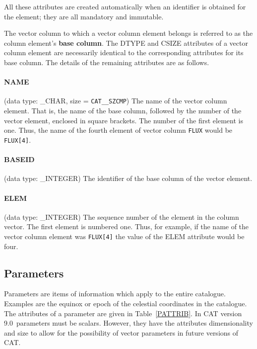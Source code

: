 \documentclass[11pt,twoside]{starlink}
\providecommand{\CATversion}{9.0~}
\begin{document}
All these attributes are created automatically when an identifier is
obtained for the element; they are all mandatory and immutable.

The vector column to which a vector column element belongs is
referred to as the column element's \textbf{base column}. The DTYPE and
CSIZE attributes of a vector column element are necessarily identical
to the corresponding attributes for its base column. The details of the
remaining attributes are as follows.

\paragraph{NAME}
(data type: \_CHAR, size = \texttt{CAT\_\_SZCMP})
The name of the vector column element. That is, the name of the base
column, followed by the number of the vector element, enclosed in
square brackets. The number of the first element is one. Thus, the name
of the fourth element of vector column \texttt{FLUX} would be \texttt{FLUX[4]}.

\paragraph{BASEID}
(data type: \_INTEGER)
The identifier of the base column of the vector element.

\paragraph{ELEM}
(data type: \_INTEGER)
The sequence number of the element in the column vector. The first
element is numbered one. Thus, for example, if the name of the vector
column element was \texttt{FLUX[4]} the value of the ELEM attribute
would be four.


\subsection{\label{PARS}Parameters}

Parameters are items of information which apply to the entire catalogue.
Examples are the equinox or epoch of the celestial coordinates in the
catalogue. The attributes of a parameter are given in
Table~\ref{PATTRIB}. In CAT version \CATversion parameters must be
scalars. However, they have the attributes dimensionality and size to
allow for the possibility of vector parameters in future versions of
CAT.
\end{document}
